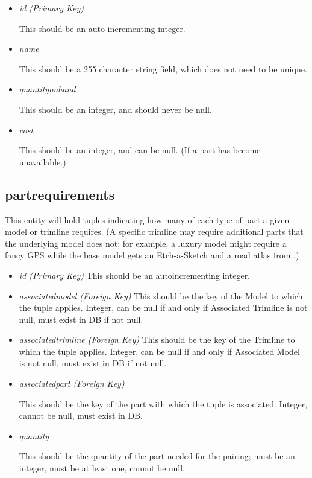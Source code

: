 \documentclass[11pt,letterpaper,oneside]{amsart}
\begin{document}
\begin{itemize}

\item \emph{id (Primary Key)}

	This should be an auto-incrementing integer.
	
\item \emph{name}

	This should be a 255 character string field, which does not need to be unique.
	
\item \emph{quantity{\textunderscore}on{\textunderscore}hand}

	This should be an integer, and should never be null.
	
\item \emph{cost}

	This should be an integer, and can be null. (If a part has become unavailable.)
	
\end{itemize}

\subsection*{part{\textunderscore}requirements}

This entity will hold tuples indicating how many of each type of part a given model or trimline requires.  (A specific trimline may require additional parts that the underlying model does not; for example, a luxury model might require a fancy GPS while the base model gets an Etch-a-Sketch and a road atlas from .)

\begin{itemize}

\item \emph{id (Primary Key)}
	This should be an autoincrementing integer.
	
\item \emph{associated{\textunderscore}model (Foreign Key)}
	This should be the key of the Model to which the tuple applies.  Integer, can be null if and only if Associated Trimline is not null, must exist in DB if not null.
	
\item \emph{associated{\textunderscore}trimline (Foreign Key)}
	This should be the key of the Trimline to which the tuple applies.  Integer, can be null if and only if Associated Model is not null, must exist in DB if not null.
	
\item \emph{associated{\textunderscore}part (Foreign Key)}

	This should be the key of the part with which the tuple is associated.  Integer, cannot be null, must exist in DB.
	
\item \emph{quantity}

	This should be the quantity of the part needed for the pairing; must be an integer, must be at least one, cannot be null.

	
\end{itemize}
\end{document}

